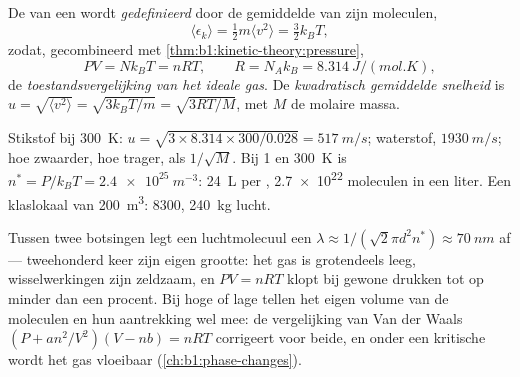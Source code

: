 \begin{definition}\label{def:b1:kinetic-theory:kinetictemp}
De  van een  wordt \emph{gedefinieerd} door de gemiddelde
 van zijn moleculen,
\[
\langle\epsilon_k\rangle = \tfrac12 m\langle v^2\rangle = \tfrac32 k_BT ,
\]
zodat, gecombineerd met \cref{thm:b1:kinetic-theory:pressure},
\[
PV = Nk_BT = nRT, \qquad R = N_Ak_B = \qty{8.314}{J/(mol.K)} ,
\]
de \emph{toestandsvergelijking van het ideale gas}. De \emph{kwadratisch
gemiddelde snelheid} is $u = \sqrt{\langle v^2\rangle} = \sqrt{3k_BT/m} = \sqrt{3RT/M}$,
met $M$ de molaire massa.
\end{definition}

\begin{example}\label{ex:b1:kinetic-theory:air}
Stikstof bij \qty{300}{K}: $u = \sqrt{3 \times 8.314 \times 300/0.028} =
\qty{517}{m/s}$; waterstof, $\qty{1930}{m/s}$; hoe zwaarder, hoe trager, als
$1/\sqrt M$. Bij \qty{1}{} en \qty{300}{K} is $n^* = P/k_BT = \qty{2.4e25}{m^{-3}}$:
\qty{24}{L} per , \qty{2.7e22}{} moleculen in een liter. Een klaslokaal van
\qty{200}{m^3}: \qty{8300}{}, \qty{240}{kg} lucht.
\end{example}

\begin{remark}\label{rem:b1:kinetic-theory:validity}
Tussen twee botsingen legt een luchtmolecuul een \emph{}
$\lambda \approx 1/(\sqrt2\pi d^2n^*) \approx \qty{70}{nm}$ af --- tweehonderd
keer zijn eigen grootte: het gas is grotendeels leeg, wisselwerkingen zijn zeldzaam, en
$PV = nRT$ klopt bij gewone drukken tot op minder dan een procent. Bij hoge
 of lage  tellen het eigen volume van de moleculen en hun
aantrekking wel mee: de vergelijking van Van der Waals $(P + an^2/V^2)(V - nb) = nRT$
corrigeert voor beide, en onder een kritische  wordt het gas vloeibaar
(\cref{ch:b1:phase-changes}).
\end{remark}

